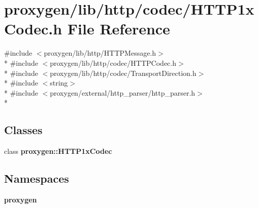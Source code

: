 \section{proxygen/lib/http/codec/\+H\+T\+T\+P1x\+Codec.h File Reference}
\label{HTTP1xCodec_8h}
{\ttfamily \#include $<$proxygen/lib/http/\+H\+T\+T\+P\+Message.\+h$>$}\\*
{\ttfamily \#include $<$proxygen/lib/http/codec/\+H\+T\+T\+P\+Codec.\+h$>$}\\*
{\ttfamily \#include $<$proxygen/lib/http/codec/\+Transport\+Direction.\+h$>$}\\*
{\ttfamily \#include $<$string$>$}\\*
{\ttfamily \#include $<$proxygen/external/http\+\_\+parser/http\+\_\+parser.\+h$>$}\\*
\subsection*{Classes}
\begin{DoxyCompactItemize}
\item 
class {\bf proxygen\+::\+H\+T\+T\+P1x\+Codec}
\end{DoxyCompactItemize}
\subsection*{Namespaces}
\begin{DoxyCompactItemize}
\item 
 {\bf proxygen}
\end{DoxyCompactItemize}
